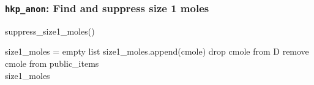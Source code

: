 \documentclass{beamer}
\begin{document}

\begin{frame}[fragile]
\frametitle{\texttt{hkp\_anon}: Find and suppress size 1 moles}
\begin{algorithm}[H]
\caption{suppress\_size1\_moles()}\label{alg:cap}
\begin{algorithmic}
\State size1\_moles = empty list
  
      
        \State size1\_moles.append(cmole)
        \State drop cmole from D  
        \State remove cmole from public\_items\\
\Return size1\_moles  
\end{algorithmic}
\end{algorithm}

\end{frame}
\end{document}
